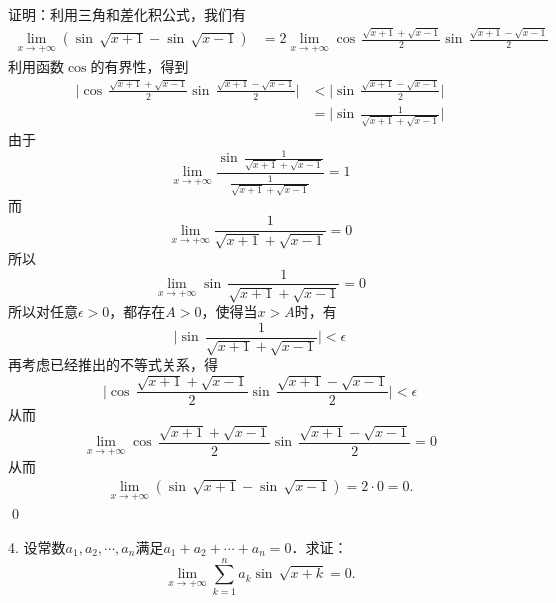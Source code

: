 证明：利用三角和差化积公式，我们有
\begin{align}
    \lim_{x \to +\infty} \left( \sin \, \sqrt{x+1} - \sin \, \sqrt{x-1} \right) &= 2 \lim_{x \to +\infty} \cos \, \displaystyle \frac{\sqrt{x+1}+\sqrt{x-1}}{2} \sin \, \displaystyle\frac{\sqrt{x+1}-\sqrt{x-1}}{2}
\end{align}
利用函数$\cos $的有界性，得到
\begin{align}
    \Bigg\lvert \cos \, \displaystyle\frac{\sqrt{x+1}+\sqrt{x-1}}{2} \sin \, \displaystyle\frac{\sqrt{x+1}-\sqrt{x-1}}{2} \Bigg\rvert &< \Bigg\lvert \sin \, \displaystyle\frac{\sqrt{x+1}-\sqrt{x-1}}{2} \Bigg\rvert \\ 
    &= \Bigg\lvert \sin \, \displaystyle\frac{1}{\sqrt{x+1}+\sqrt{x-1}} \Bigg\rvert
\end{align}
由于
\begin{equation}
    \lim_{x \to +\infty} \displaystyle\frac{\sin \, \displaystyle\frac{1}{\sqrt{x+1}+\sqrt{x-1}}}{\displaystyle\frac{1}{\sqrt{x+1}+\sqrt{x-1}}} = 1
\end{equation}
而
\begin{equation}
    \lim_{x \to +\infty} \displaystyle\frac{1}{\sqrt{x+1}+\sqrt{x-1}} = 0
\end{equation}
所以
\begin{equation}
    \lim_{x \to +\infty} \sin \, \displaystyle\frac{1}{\sqrt{x+1}+\sqrt{x-1}} = 0
\end{equation}
所以对任意$\epsilon > 0$，都存在$A > 0$，使得当$x > A$时，有
\begin{equation}
    \Bigg\lvert\sin \, \displaystyle\frac{1}{\sqrt{x+1}+\sqrt{x-1}}\Bigg\rvert<\epsilon
\end{equation}
再考虑已经推出的不等式关系，得
\begin{equation}
    \Bigg\lvert\cos\,\displaystyle\frac{\sqrt{x+1}+\sqrt{x-1}}{2}\sin\,\displaystyle\frac{\sqrt{x+1}-\sqrt{x-1}}{2} \Bigg\rvert<\epsilon
\end{equation}
从而
\begin{equation}
    \lim_{x \to +\infty} \cos \, \displaystyle\frac{\sqrt{x+1}+\sqrt{x-1}}{2}\sin\,\displaystyle\frac{\sqrt{x+1}-\sqrt{x-1}}{2}=0
\end{equation}
从而
\begin{eqnarray}
    \lim_{x \to +\infty} \left(\sin \, \sqrt{x+1}-\sin \, \sqrt{x-1}\right) = 2 \cdot 0 = 0.
\end{eqnarray}
\qed

4. 设常数$a_1,a_2,\cdots,a_n$满足$a_1+a_2+\cdots+a_n=0$．求证：
\begin{equation}
    \lim_{x \to +\infty}\sum_{k=1}^{n}a_k\sin \, \sqrt{x+k}=0.
\end{equation}

